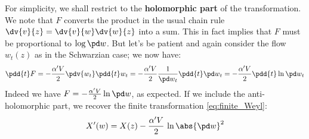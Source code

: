 \documentclass[a4paper
	,10pt
]{article}
\begin{document}
	For simplicity, we shall restrict to the \textbf{holomorphic part} of the transformation.
	We note that $F$ converts the product in the usual chain rule $
		\dv{v}{z}
		= \dv{v}{w} \dv{w}{z} 
	$ into a sum. This in fact implies that $F$ must be proportional to $\log \pd w$. But let's be patient and again consider the flow $w_t(z)$ as in the Schwarzian case; we now have:
	\begin{equation}
		\pdd{t} F
		= - \frac{\alpha'V}{2}
				\pdv{w_t} \pdd{t} w_t
		= - \frac{\alpha'V}{2}
				\frac{1}{\pd w_t} \pdd{t} \pd w_t
		= - \frac{\alpha'V}{2}
				\pdd{t} \ln \pd w_t
	\end{equation}
	Indeed we have $
		F = - \frac{\alpha'V}{2} \ln \pd w
	$, as expected. If we include the anti-holomorphic part, we recover the finite transformation \eqref{eq:finite_Weyl}:
	\begin{equation}
		X'(w)
		= X(z) - \frac{\alpha' V}{2}\, \ln \abs{\pd w}^2
	\end{equation}
	
	
\raggedright
\printbibliography[%
	,heading = bibintoc
]
\end{document}
